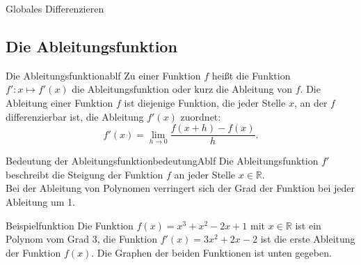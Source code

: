 \begin{section}{Globales Differenzieren}
\subsection{Die Ableitungsfunktion}
\begin{defi}{Die Ableitungsfunktion}{ablf}
    Zu einer Funktion $f$ heißt die Funktion $f': x \mapsto f'(x)$ die Ableitungsfunktion oder kurz die Ableitung von $f$. Die Ableitung einer Funktion $f$ ist diejenige Funktion, die jeder Stelle $x$, an der $f$ differenzierbar ist, die Ableitung $f'(x)$ zuordnet:
$$f'(x)=\lim_{h\rightarrow 0} \dfrac{f(x + h) - f(x)}{h}.$$ 
\end{defi}
\begin{bem}{Bedeutung der Ableitungsfunktion}{bedeutungAblf}
   Die Ableitungsfunktion $f'$ beschreibt die Steigung der Funktion $f$ an jeder Stelle $x\in \mathds{R}$. \\
   Bei der Ableitung von Polynomen verringert sich der Grad der Funktion bei jeder Ableitung um 1.\\
\end{bem}
\begin{bsp}{Beispielfunktion}{}
Die Funktion $f(x) = x^3 + x^2 -2x+1$ mit $x\in\mathds{R}$ ist ein Polynom vom Grad 3, die Funktion $f'(x) = 3x^2+2x-2$ ist die erste Ableitung der Funktion $f(x)$. Die Graphen der beiden Funktionen ist unten gegeben. 
\begin{center}
\end{center}
\end{bsp}

\end{section}
